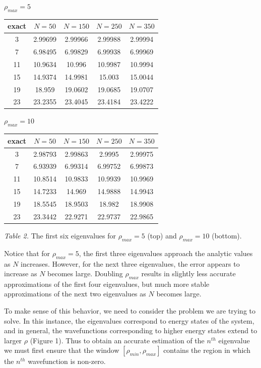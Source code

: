 \documentclass[prb,aps,twocolumn,showpacs,10pt]{revtex4-1}
\begin{document}
\begin{center}
$\rho_{max} = 5$\\
\begin{tabular}{|c|c|c|c|c|}
\hline
exact & $N=50$ & $N=150$& $N=250$& $N=350$\\
\hline
\hline
3 & 2.99699&2.99966 & 2.99988 & 2.99994\\
\hline
7 & 6.98495 & 6.99829 & 6.99938 & 6.99969\\
\hline
11 & 10.9634 & 10.996 & 10.9987 & 10.9994\\
\hline
15 & 14.9374&14.9981 & 15.003 & 15.0044\\
\hline
19 & 18.959 & 19.0602 & 19.0685 & 19.0707\\
\hline
23 & 23.2355 & 23.4045 & 23.4184 & 23.4222\\
\hline
\end{tabular}
\vspace*{5mm}

$\rho_{max} = 10$\\
\begin{tabular}{|c|c|c|c|c|}
\hline
exact & $N=50$ & $N=150$& $N=250$& $N=350$\\
\hline
\hline
3 & 2.98793&2.99863 & 2.9995 & 2.99975\\
\hline
7 & 6.93939 & 6.99314 & 6.99752 & 6.99873\\
\hline
11 & 10.8514 & 10.9833 & 10.9939 & 10.9969\\
\hline
15 & 14.7233 &14.969 & 14.9888 & 14.9943\\
\hline
19 & 18.5545 & 18.9503 & 18.982 & 18.9908\\
\hline
23 & 23.3442 & 22.9271 & 22.9737 & 22.9865\\
\hline
\end{tabular}
\vspace*{5mm}

\textit{Table 2.} The first six eigenvalues for $\rho_{max} = 5$ (top) and $\rho_{max} = 10$ (bottom).
\vspace*{2mm}
\end{center}

Notice that for $\rho_{max}=5$, the first three eigenvalues approach the analytic values as $N$ increases. However, for the next three eigenvalues, the error appears to increase as $N$ becomes large. Doubling $\rho_{max}$ results in slightly less accurate approximations of the first four eigenvalues, but much more stable approximations of the next two eigenvalues as $N$ becomes large.

To make sense of this behavior, we need to consider the problem we are trying to solve. In this instance, the eigenvalues correspond to energy states of the system, and in general, the wavefunctions corresponding to higher energy states extend to larger $\rho$ (Figure 1). Thus to obtain an accurate estimation of the $n^{th}$ eigenvalue we must first ensure that the window $\left[ \rho_{min},\rho_{max} \right]$ contains the region in which the $n^{th}$ wavefunction is non-zero. 
\end{document}
